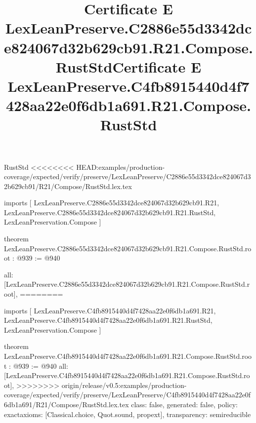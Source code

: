 \begin{lexlean}{RustStd}
<<<<<<<< HEAD:examples/production-coverage/expected/verify/preserve/LexLeanPreserve/C2886e55d3342dce824067d32b629cb91/R21/Compose/RustStd.lex.tex
\title{Certificate E LexLeanPreserve.C2886e55d3342dce824067d32b629cb91.R21.Compose.RustStd}
\begin{coremodule}
imports [
  LexLeanPreserve.C2886e55d3342dce824067d32b629cb91.R21,
  LexLeanPreserve.C2886e55d3342dce824067d32b629cb91.R21.RustStd,
  LexLeanPreservation.Compose
]

theorem LexLeanPreserve.C2886e55d3342dce824067d32b629cb91.R21.Compose.RustStd.root : @939 := @940 {
  all: [LexLeanPreserve.C2886e55d3342dce824067d32b629cb91.R21.Compose.RustStd.root],
========
\title{Certificate E LexLeanPreserve.C4fb8915440d4f7428aa22e0f6db1a691.R21.Compose.RustStd}
\begin{coremodule}
imports [
  LexLeanPreserve.C4fb8915440d4f7428aa22e0f6db1a691.R21,
  LexLeanPreserve.C4fb8915440d4f7428aa22e0f6db1a691.R21.RustStd,
  LexLeanPreservation.Compose
]

theorem LexLeanPreserve.C4fb8915440d4f7428aa22e0f6db1a691.R21.Compose.RustStd.root : @939 := @940 {
  all: [LexLeanPreserve.C4fb8915440d4f7428aa22e0f6db1a691.R21.Compose.RustStd.root],
>>>>>>>> origin/release/v0.5:examples/production-coverage/expected/verify/preserve/LexLeanPreserve/C4fb8915440d4f7428aa22e0f6db1a691/R21/Compose/RustStd.lex.tex
  class: false,
  generated: false,
  policy: exact{axioms: [Classical.choice, Quot.sound, propext]},
  transparency: semireducible
}


\end{coremodule}}
\end{coremodule}
\end{lexlean}
